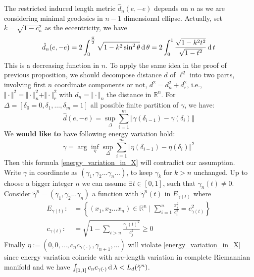 \begin{rmk}
\begin{enumerate}
		      The restricted induced length metric $\hat{d}_n(e,-e)$ depends on $n$ as we are considering minimal geodesics in $n-1$ dimensional ellipse. Actually, set $k=\sqrt{1-c_n^2}$ as the eccentricity, we have
		      \[
			      \hat{d}_n(e,-e)= 2\int _{0}^{\tfrac {\pi }{2}}{\sqrt {1-k^{2}\sin ^{2}\theta }}\operatorname{d} \theta = 2\int _{0}^{1}{\frac {\sqrt {1-k^{2}t^{2}}}{\sqrt {1-t^{2}}}}\operatorname{d} t
		      \]
		      This is a decreasing function in $n$.	To apply the same idea in the proof of previous proposition, we should decompose distance $d$ of $\ell^2$ into two parts, involving first $n$ coordinate components or not, $d^2=d_n^2+d_r^2$, i.e., $\Vert \cdot \Vert^2 = \Vert \cdot \Vert_n^2 + \Vert \cdot \Vert_r^2$ with $d_n=\Vert \cdot \Vert_n$ the distance in $\mathbb{R} ^n $. For $\Delta=[\delta_0=0,\delta_1, \ldots, \delta_m=1]$ all possible finite partition of $\gamma$, we have:
		      \[
			      \hat{d}(e,-e)=\sup_{\Delta} \sum_{i=1}^{m} \Vert\gamma(\delta_{i-1}) - \gamma(\delta_{i})\Vert
		      \]
		      We \textbf{would like to} have following energy variation hold:
		      \begin{equation}
			      \label{energy_variation_in_X}
			      \gamma = \operatorname{arg} \inf_{\eta} \sup_{\Delta} \sum_{i=1}^{m} \Vert\eta(\delta_{i-1})- \eta(\delta_{i})\Vert^2
		      \end{equation}
		      Then this formula \ref{energy_variation_in_X} will contradict our assumption. Write $\gamma$ in coordinate as $(\gamma_1, \gamma_2\ldots\gamma_n\ldots)$, to keep $\gamma_k$ for $ k > n$ unchanged. Up to choose a bigger integer $n$ we can assume $ \exists t \in [0,1]$, such that $\gamma_n(t) \neq 0$. Consider $\tilde{\gamma}^n = (\gamma_1, \gamma_2 \ldots \gamma_n)$ a function with $\tilde\gamma^n(t)$ in $E_{\gamma(t)}$ where
		      \begin{align*}
			      E_{\gamma(t)} : & = \left\{ (x_1,x_2 \ldots x_n) \in \mathbb{R}^n \mid \sum_{i=1}^n \frac{x_i^2}{ c_i^2} = c_{\gamma(t)}^2\right\} \\
			      c_{\gamma(t)}:  & =\sqrt{ 1- \sum_{i > n} \frac{\gamma_j(t)^2}{c_j^2}} \geq 0
		      \end{align*}
		      Finally $\eta := (0,0,\ldots, c_n c_{\gamma(\cdot)},\gamma_{n+1},\ldots)$ will violate \ref{energy_variation_in_X} since energy variation coincide with arc-length variation in complete Riemannian manifold and we have $\int_{[0,1]} c_n c_{\gamma(\cdot)} \operatorname{d} \lambda < L_d(\tilde{\gamma}^n)$.


\end{enumerate}
\end{rmk}
